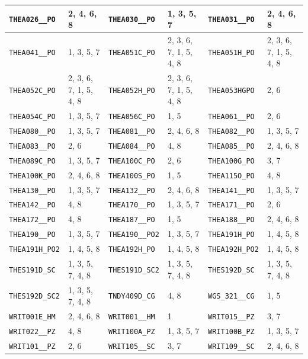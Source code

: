 \begin{longtable}{|l|l||l|l||l|l|}
    \verb|THEA026__PO| & 2, 4, 6, 8 & \verb|THEA030__PO| & 1, 3, 5, 7 & \verb|THEA031__PO| & 2, 4, 6, 8\\\hline
    \verb|THEA041__PO| & 1, 3, 5, 7 & \verb|THEA051C_PO| & 2, 3, 6, 7, 1, 5, 4, 8 & \verb|THEA051H_PO| & 2, 3, 6, 7, 1, 5, 4, 8\\\hline
    \verb|THEA052C_PO| & 2, 3, 6, 7, 1, 5, 4, 8 & \verb|THEA052H_PO| & 2, 3, 6, 7, 1, 5, 4, 8 & \verb|THEA053HGPO| & 2, 6\\\hline
    \verb|THEA054C_PO| & 1, 3, 5, 7 & \verb|THEA056C_PO| & 1, 5 & \verb|THEA061__PO| & 2, 6\\\hline
    \verb|THEA080__PO| & 1, 3, 5, 7 & \verb|THEA081__PO| & 2, 4, 6, 8 & \verb|THEA082__PO| & 1, 3, 5, 7\\\hline
    \verb|THEA083__PO| & 2, 6 & \verb|THEA084__PO| & 4, 8 & \verb|THEA085__PO| & 2, 4, 6, 8\\\hline
    \verb|THEA089C_PO| & 1, 3, 5, 7 & \verb|THEA100C_PO| & 2, 6 & \verb|THEA100G_PO| & 3, 7\\\hline
    \verb|THEA100K_PO| & 2, 4, 6, 8 & \verb|THEA100S_PO| & 1, 5 & \verb|THEA115O_PO| & 4, 8\\\hline
    \verb|THEA130__PO| & 1, 3, 5, 7 & \verb|THEA132__PO| & 2, 4, 6, 8 & \verb|THEA141__PO| & 1, 3, 5, 7\\\hline
    \verb|THEA142__PO| & 4, 8 & \verb|THEA170__PO| & 1, 3, 5, 7 & \verb|THEA171__PO| & 2, 6\\\hline
    \verb|THEA172__PO| & 4, 8 & \verb|THEA187__PO| & 1, 5 & \verb|THEA188__PO| & 2, 4, 6, 8\\\hline
    \verb|THEA190__PO| & 1, 3, 5, 7 & \verb|THEA190__PO2| & 1, 3, 5, 7 & \verb|THEA191H_PO| & 1, 4, 5, 8\\\hline
    \verb|THEA191H_PO2| & 1, 4, 5, 8 & \verb|THEA192H_PO| & 1, 4, 5, 8 & \verb|THEA192H_PO2| & 1, 4, 5, 8\\\hline
    \verb|THES191D_SC| & 1, 3, 5, 7, 4, 8 & \verb|THES191D_SC2| & 1, 3, 5, 7, 4, 8 & \verb|THES192D_SC| & 1, 3, 5, 7, 4, 8\\\hline
    \verb|THES192D_SC2| & 1, 3, 5, 7, 4, 8 & \verb|TNDY409D_CG| & 4, 8 & \verb|WGS_321__CG| & 1, 5\\\hline
    \verb|WRIT001E_HM| & 2, 4, 6, 8 & \verb|WRIT001__HM| & 1 & \verb|WRIT015__PZ| & 3, 7\\\hline
    \verb|WRIT022__PZ| & 4, 8 & \verb|WRIT100A_PZ| & 1, 3, 5, 7 & \verb|WRIT100B_PZ| & 1, 3, 5, 7\\\hline
    \verb|WRIT101__PZ| & 2, 6 & \verb|WRIT105__SC| & 3, 7 & \verb|WRIT109__SC| & 2, 4, 6, 8\\\hline

\end{longtable}
